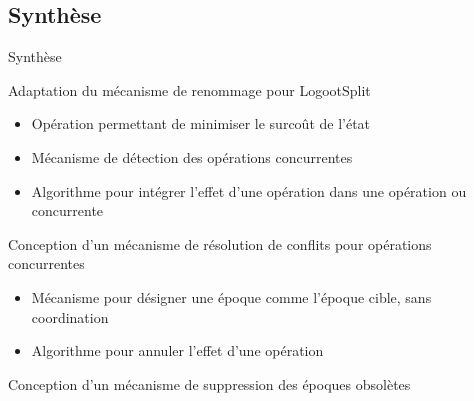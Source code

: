 \subsection{Synthèse}

\begin{frame}{Synthèse}
  \begin{block}{Adaptation du mécanisme de renommage pour LogootSplit}
    \pause
    \begin{itemize}
      \item Opération \ren permettant de minimiser le surcoût de l'état
      \item Mécanisme de détection des opérations concurrentes
      \item Algorithme pour intégrer l'effet d'une opération \ren dans une opération \ins ou \rmv concurrente
    \end{itemize}
  \end{block}
  \pause
  \begin{block}{Conception d'un mécanisme de résolution de conflits pour opérations \ren concurrentes}
    \pause
    \begin{itemize}
      \item Mécanisme pour désigner une époque comme l'époque cible, sans coordination
      \item Algorithme pour annuler l'effet d'une opération \ren
    \end{itemize}
  \end{block}
  \pause
  \begin{block}{Conception d'un mécanisme de suppression des époques obsolètes}
  \end{block}
\end{frame}

